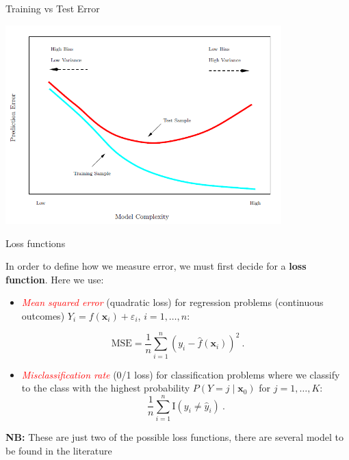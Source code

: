\documentclass[
  10pt,
  ignorenonframetext,
]{beamer}
\providecommand{\tightlist}{%
  \setlength{\itemsep}{0pt}\setlength{\parskip}{0pt}}
\begin{document}
\begin{frame}
\begin{block}{Training vs Test Error}
\protect\hypertarget{training-vs-test-error}{}
\(~\)

\centering

\includegraphics[width=0.8\textwidth,height=\textheight]{training_test.png}
\end{block}
\end{frame}

\begin{frame}
\begin{block}{Loss functions}
\protect\hypertarget{loss-functions}{}
\(~\)

In order to define how we measure error, we must first decide for a
\textbf{loss function}. Here we use:

\vspace{2mm}

\begin{itemize}
\tightlist
\item
  \emph{\textcolor{red}{Mean squared error}} (quadratic loss) for
  regression problems (continuous outcomes)
  \(Y_i=f({\boldsymbol x}_i)+\varepsilon_i\), \(i=1,\ldots, n\):
\end{itemize}

\[\text{MSE}=\frac{1}{n}\sum_{i=1}^n (y_i-\hat{f}({\boldsymbol x}_i))^2 \ .\]

\vspace{2mm}

\begin{itemize}
\tightlist
\item
  \emph{\textcolor{red}{Misclassification rate}} (0/1 loss) for
  classification problems where we classify to the class with the
  highest probability \(P(Y=j\mid {\boldsymbol x}_0)\) for
  \(j=1,\ldots,K\):
  \[\frac{1}{n}\sum_{i=1}^n \text{I}(y_i \neq \hat{y}_i) \ .\]
\end{itemize}

\vspace{2mm}

\textbf{NB:} These are just two of the possible loss functions, there
are several model to be found in the literature
\end{block}
\end{frame}
\end{document}
